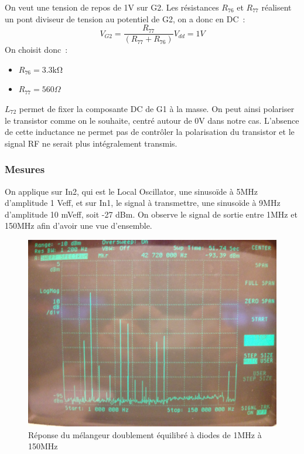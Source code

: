 \documentclass{article}
\begin{document}

On veut une tension de repos de 1V sur G2.
Les résistances $R_{76}$ et $R_{77}$ réalisent un pont diviseur de tension au potentiel de G2, on a donc en DC~:
\begin{equation*}
V_{G2}=\frac{R_{77}}{(R_{77}+R_{76})}V_{dd}=1V
\end{equation*}
On choisit donc~:
\begin{itemize}
\item $R_{76}= 3.3 \mathrm{k\Omega}$
\item $R_{77}= 560 \Omega$
\end{itemize}


$L_{72}$ permet de fixer la composante DC de G1 à la masse. On peut ainsi polariser le transistor comme on le souhaite, centré autour de 0V dans notre cas. L'absence de cette inductance ne permet pas de contrôler la polarisation du transistor et le signal RF ne serait plus intégralement transmis.

\subsubsection{Mesures}


On applique sur In2, qui est le Local Oscillator, une sinusoïde à 5MHz d'amplitude 1 Veff, et sur In1, le signal à transmettre, une sinusoïde à 9MHz d'amplitude 10 mVeff, soit -27 dBm.
On observe le signal de sortie entre 1MHz et 150MHz afin d'avoir une vue d'ensemble.
\begin{figure}[h!]
	\centering
	\includegraphics[width=.7\textwidth]{10_3_1}
	\caption{Réponse du mélangeur doublement équilibré à diodes de 1MHz à 150MHz}
	\label{fig:10_3_1}
\end{figure}
\end{document}
